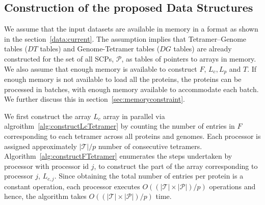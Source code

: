 \documentclass{article}[11pt]
\begin{document}
\subsection{Construction of the proposed Data Structures}
We assume that the input datasets are available in memory in a format as shown in the section~\ref{data:current}.
The assumption implies that Tetramer--Genome tables ($DT$ tables) and Genome-Tetramer tables ($DG$ tables) are already constructed for the set of all SCPs, $\mathcal{P}$, as tables of pointers to arrays in memory. 
We also assume that enough memory is available to construct $F$, $L_c, L_p$ and $T$. 
If enough memory is not available to load all the proteins, the proteins can be processed in batches, with enough memory available to accommodate each batch. 
We further discuss this in section~\ref{sec:memoryconstraint}. 


We first construct the array $L_c$ array in parallel via algroithm~\ref{alg:constructLcTetramer} by counting the number of entries in $F$ corresponding to each tetramer across all proteins and genomes.
Each processor is assigned approximately $|\mathcal{T}|/p$ number of consecutive tetramers.
Algorithm~\ref{alg:constructFTetramer} enumerates the steps undertaken by processor with processor id $j$, to construct the part of the array corresponding to processor $j$, $L_{c,j}$. 
Since obtaining the total number of entries per protein is a constant operation, each processor executes $O((|\mathcal{T}| \times |\mathcal{P}|)/p)$ operations and hence, the algorithm takes $O((|\mathcal{T}| \times |\mathcal{P}|)/p)$ time. 

\begin{algorithm}[H]
\caption{Construct $L_c$ and $L_p$ in parallel}
\label{alg:constructLcTetramer}
\end{algorithm}
\end{document}
